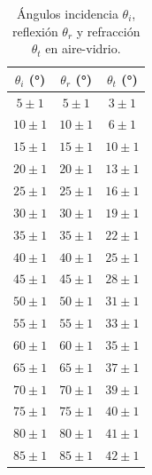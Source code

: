 \documentclass[a4paper,twocolumn]{article}
\begin{document}
        	\begin{table}[!ht]
        		\centering
        		\caption{Ángulos incidencia $\theta_i$, reflexión $\theta_r$ y refracción $\theta_t$ en aire-vidrio.}
        		\vspace{0.1cm}
        		\begin{tabular}{ccc} %
        			
        			\toprule %
        			
        			$\theta_i$ (°) & $\theta_r$ (°) & $\theta_t$ (°) \\
        			
        			\midrule %
        			
        			$5 \pm 1$   & $5 \pm 1$     & $3 \pm 1$ \\
        			$10 \pm 1$  & $10 \pm 1$     & $6 \pm 1$ \\
        			$15 \pm 1$  & $15 \pm 1$     & $10 \pm 1$ \\
        			$20 \pm 1$  & $20 \pm 1$     & $13 \pm 1$ \\
        			$25 \pm 1$  & $25 \pm 1$     & $16 \pm 1$ \\
        			$30 \pm 1$  & $30 \pm 1$     & $19 \pm 1$ \\
        			$35 \pm 1$  & $35 \pm 1$     & $22 \pm 1$ \\
        			$40 \pm 1$  & $40 \pm 1$     & $25 \pm 1$ \\
        			$45 \pm 1$  & $45 \pm 1$     & $28 \pm 1$ \\
        			$50 \pm 1$  & $50 \pm 1$     & $31 \pm 1$ \\
        			$55 \pm 1$  & $55 \pm 1$     & $33 \pm 1$ \\
        			$60 \pm 1$  & $60 \pm 1$     & $35 \pm 1$ \\
        			$65 \pm 1$  & $65 \pm 1$     & $37 \pm 1$ \\
        			$70 \pm 1$  & $70 \pm 1$     & $39 \pm 1$ \\
        			$75 \pm 1$  & $75 \pm 1$     & $40 \pm 1$ \\
        			$80 \pm 1$  & $80 \pm 1$     & $41 \pm 1$ \\
        			$85 \pm 1$  & $85 \pm 1$     & $42 \pm 1$ \\
        			
        			\bottomrule 
        			
        		\end{tabular}
        		\label{tab:AngAirVid}
        	\end{table}
\end{document}
